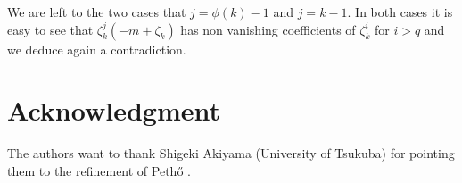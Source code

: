 We are left to the two cases that $j=\phi(k)-1$ and $j=k-1$. In both cases it is easy to see that $\zeta_k^j(-m+\zeta_k)$ has non vanishing coefficients of 
$\zeta_k^i$ for $i>q$ and we deduce again a contradiction.

\section*{Acknowledgment}

The authors want to thank Shigeki Akiyama (University of Tsukuba) for
pointing them to the refinement of Peth{\H o} \cite[Theorem
7.1]{pethoe1991:polynomial_transformation_and}.




